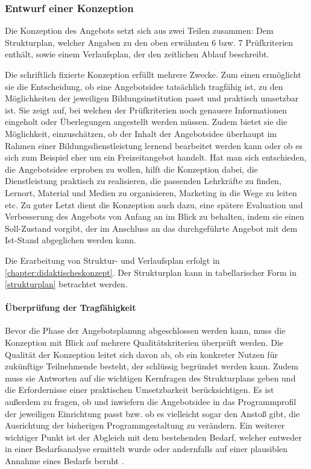 \documentclass[
  twoside,
  parskip=half-,
]{scrreprt}
\begin{document}
\subsubsection{Entwurf einer Konzeption}

Die Konzeption des Angebots setzt sich aus zwei Teilen zusammen: Dem Strukturplan, welcher Angaben zu den oben erwähnten 6 bzw. 7 Prüfkriterien enthält, sowie einem Verlaufsplan, der den zeitlichen Ablauf beschreibt. \autocite[vgl.][91f.]{schlutz}

Die schriftlich fixierte Konzeption erfüllt mehrere Zwecke. Zum einen ermöglicht sie die Entscheidung, ob eine Angebotsidee tatsächlich tragfähig ist, zu den Möglichkeiten der jeweiligen Bildungsinstitution passt und praktisch umsetzbar ist. Sie zeigt auf, bei welchen der Prüfkriterien noch genauere Informationen eingeholt oder Überlegungen angestellt werden müssen. Zudem bietet sie die Möglichkeit, einzuschätzen, ob der Inhalt der Angebotsidee überhaupt im Rahmen einer Bildungsdienstleistung lernend bearbeitet werden kann oder ob es sich zum Beispiel eher um ein Freizeitangebot handelt. Hat man sich entschieden, die Angebotsidee erproben zu wollen, hilft die Konzeption dabei, die Dienstleistung praktisch zu realisieren, die passenden Lehrkräfte zu finden, Lernort, Material und Medien zu organisieren, Marketing in die Wege zu leiten etc. Zu guter Letzt dient die Konzeption auch dazu, eine spätere Evaluation und Verbesserung des Angebots von Anfang an im Blick zu behalten, indem sie einen Soll-Zustand vorgibt, der im Anschluss an das durchgeführte Angebot mit dem Ist-Stand abgeglichen werden kann.

\begin{praxis}
  Die Erarbeitung von Struktur- und Verlaufsplan erfolgt in \autoref{chapter:didaktischeskonzept}. Der Strukturplan kann in tabellarischer Form in \autoref{strukturplan} betrachtet werden. 
\end{praxis}

\paragraph{Überprüfung der Tragfähigkeit}

Bevor die Phase der Angebotsplanung abgeschlossen werden kann, muss die Konzeption mit Blick auf mehrere Qualitätskriterien überprüft werden. Die Qualität der Konzeption leitet sich davon ab, ob ein konkreter Nutzen für zukünftige Teilnehmende besteht, der schlüssig begründet werden kann. Zudem muss sie Antworten auf die wichtigen Kernfragen des Strukturplans geben und die Erfordernisse einer praktischen Umsetzbarkeit berücksichtigen. Es ist außerdem zu fragen, ob und inwiefern die Angebotsidee in das Programmprofil der jeweiligen Einrichtung passt bzw. ob es vielleicht sogar den Anstoß gibt, die Ausrichtung der bisherigen Programmgestaltung zu verändern. Ein weiterer wichtiger Punkt ist der Abgleich mit dem bestehenden Bedarf, welcher entweder in einer Bedarfsanalyse ermittelt wurde oder andernfalls auf einer plausiblen Annahme eines Bedarfs beruht \autocite[vgl.][105ff.]{schlutz}.
\end{document}

